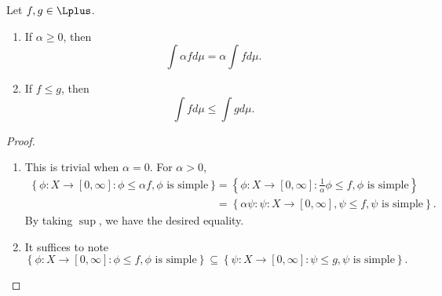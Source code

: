 \documentclass[pmath451]{subfiles}
\begin{document}
    \begin{prop}{}
        Let $f,g\in\Lplus$.
        \begin{enumerate}
            \item If $\alpha\geq 0$, then
                \begin{equation*}
                    \int\alpha fd\mu = \alpha\int fd\mu.
                \end{equation*}
            \item If $f\leq g$, then
                \begin{equation*}
                    \int fd\mu \leq \int gd\mu.
                \end{equation*}
        \end{enumerate}
    \end{prop}

    \begin{proof}
        \begin{enumerate}
            \item This is trivial when $\alpha=0$. For $\alpha>0$,
                \begin{equation*}
                    \begin{aligned}
                        \left\lbrace \phi:X\to\left[ 0,\infty \right]: \phi\leq\alpha f, \phi\text{ is simple} \right\rbrace & = \left\lbrace \phi:X\to \left[ 0,\infty \right]: \frac{1}{\alpha}\phi\leq f, \phi\text{ is simple} \right\rbrace  \\
                                                                                                                             & = \left\lbrace \alpha\psi: \psi: X\to\left[ 0,\infty \right], \psi\leq f, \psi\text{ is simple} \right\rbrace.
                    \end{aligned} 
                \end{equation*}
                By taking $\sup$, we have the desired equality.

            \item It suffices to note
                \begin{equation*}
                    \left\lbrace \phi:X\to\left[ 0,\infty \right] : \phi\leq f,\phi\text{ is simple} \right\rbrace \subseteq \left\lbrace \psi:X\to\left[ 0,\infty \right] : \psi\leq g, \psi\text{ is simple} \right\rbrace.
                \end{equation*}
        \end{enumerate}
    \end{proof}
\end{document}
